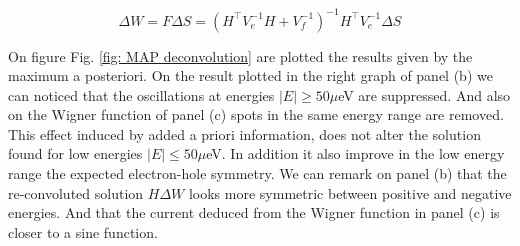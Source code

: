 \begin{equation}
\Delta W = F\Delta S = \left(H^{\top}V^{-1}_{e}H+V^{-1}_{f}\right)^{-1}H^{\top}V^{-1}_{e}\Delta S \label{eq: MAP equation}
\end{equation}

On figure Fig. \ref{fig: MAP deconvolution} are plotted the results given by the maximum a posteriori. On the result plotted in the right graph of panel (b) we can noticed that the oscillations at energies $\left|E\right| \geq 50 \mu$eV are suppressed. And also on the Wigner function of panel (c) spots in the same energy range are removed. This effect induced by added a priori information, does not alter the solution found for low energies $\left|E\right| \leq 50 \mu$eV. In addition it also improve in the low energy range the expected electron-hole symmetry. We can remark on panel (b) that the re-convoluted solution $H\Delta W$ looks more symmetric between positive and negative energies. And that the current deduced from the Wigner function in panel (c) is closer to a sine function.

